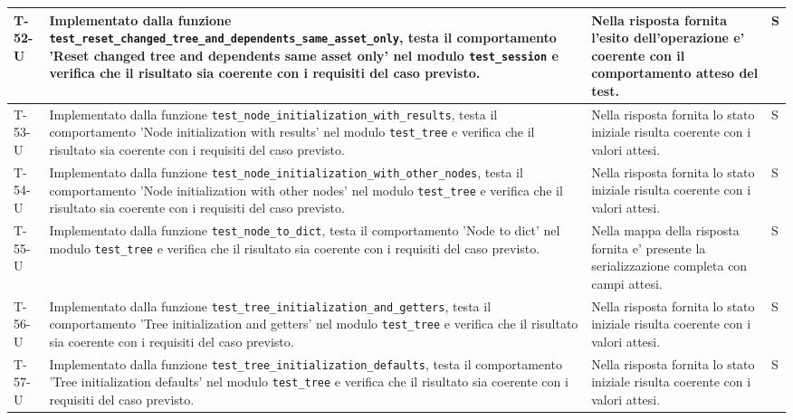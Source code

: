\documentclass[a4paper,12pt]{article}
\begin{document}
{{\begin{longtable}{|>{\RaggedRight\arraybackslash}p{1.55cm}|>{\RaggedRight\arraybackslash}p{8.0cm}|>{\RaggedRight\arraybackslash}p{4.6cm}|>{\RaggedRight\arraybackslash}p{1.2cm}|}
        \hline
        T-52-U & Implementato dalla funzione \texttt{test\_\allowbreak reset\_\allowbreak changed\_\allowbreak tree\_\allowbreak and\_\allowbreak dependents\_\allowbreak same\_\allowbreak asset\_\allowbreak only}, testa il comportamento 'Reset changed tree and dependents same asset only' nel modulo \texttt{test\_\allowbreak session} e verifica che il risultato sia coerente con i requisiti del caso previsto. & Nella risposta fornita l'esito dell'operazione e' coerente con il comportamento atteso del test. & S \\
        \hline
        T-53-U & Implementato dalla funzione \texttt{test\_\allowbreak node\_\allowbreak initialization\_\allowbreak with\_\allowbreak results}, testa il comportamento 'Node initialization with results' nel modulo \texttt{test\_\allowbreak tree} e verifica che il risultato sia coerente con i requisiti del caso previsto. & Nella risposta fornita lo stato iniziale risulta coerente con i valori attesi. & S \\
        \hline
        T-54-U & Implementato dalla funzione \texttt{test\_\allowbreak node\_\allowbreak initialization\_\allowbreak with\_\allowbreak other\_\allowbreak nodes}, testa il comportamento 'Node initialization with other nodes' nel modulo \texttt{test\_\allowbreak tree} e verifica che il risultato sia coerente con i requisiti del caso previsto. & Nella risposta fornita lo stato iniziale risulta coerente con i valori attesi. & S \\
        \hline
        T-55-U & Implementato dalla funzione \texttt{test\_\allowbreak node\_\allowbreak to\_\allowbreak dict}, testa il comportamento 'Node to dict' nel modulo \texttt{test\_\allowbreak tree} e verifica che il risultato sia coerente con i requisiti del caso previsto. & Nella mappa della risposta fornita e' presente la serializzazione completa con campi attesi. & S \\
        \hline
        T-56-U & Implementato dalla funzione \texttt{test\_\allowbreak tree\_\allowbreak initialization\_\allowbreak and\_\allowbreak getters}, testa il comportamento 'Tree initialization and getters' nel modulo \texttt{test\_\allowbreak tree} e verifica che il risultato sia coerente con i requisiti del caso previsto. & Nella risposta fornita lo stato iniziale risulta coerente con i valori attesi. & S \\
        \hline
        T-57-U & Implementato dalla funzione \texttt{test\_\allowbreak tree\_\allowbreak initialization\_\allowbreak defaults}, testa il comportamento 'Tree initialization defaults' nel modulo \texttt{test\_\allowbreak tree} e verifica che il risultato sia coerente con i requisiti del caso previsto. & Nella risposta fornita lo stato iniziale risulta coerente con i valori attesi. & S \\

\end{longtable}}}
\end{document}
